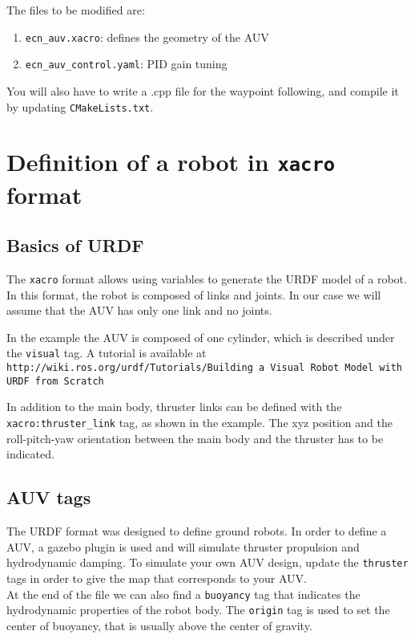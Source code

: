 \documentclass{ecnreport}
\begin{document}
The files to be modified are:
\begin{enumerate}
 \item \texttt{ecn\_auv.xacro}: defines the geometry of the AUV
 \item \texttt{ecn\_auv\_control.yaml}: PID gain tuning
\end{enumerate}
You will also have to write a .cpp file for the waypoint following, and compile it by updating \texttt{CMakeLists.txt}.



\section{Definition of a robot in \texttt{xacro} format}

\subsection{Basics of URDF}

The \texttt{xacro} format allows using variables to generate the URDF model of a robot. 
In this format, the robot is composed of links and joints. In our case we will assume that the AUV has only one link and no joints.

In the example the AUV is composed of one cylinder, which is described under the \texttt{visual} tag.
A tutorial is available at \texttt{http://wiki.ros.org/urdf/Tutorials/Building a Visual Robot Model with URDF from Scratch}

In addition to the main body, thruster links can be defined with the \texttt{xacro:thruster\_link} tag, as  shown in the example.
The xyz position and the roll-pitch-yaw orientation between the main body and the thruster has to be indicated.

\subsection{AUV tags}

The URDF format was designed to define ground robots. In order to define a AUV, a gazebo plugin is used and will simulate thruster propulsion and hydrodynamic damping.
To simulate your own AUV design, update the \texttt{thruster} tags  in order to give the map that corresponds to your AUV. \\
At the end of the file we can also find a \texttt{buoyancy} tag that indicates the hydrodynamic properties of the robot body. The \texttt{origin} tag is used to set the center of buoyancy, that is usually above the center of gravity.
\end{document}
